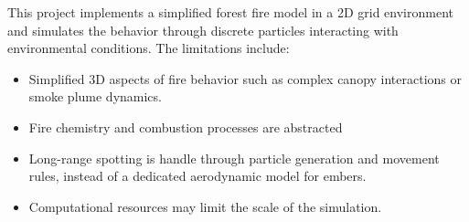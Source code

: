 This project implements a simplified forest fire model in a 2D grid environment and simulates the behavior through discrete particles interacting with environmental conditions.\newline 
The limitations include:
\begin{itemize}
	\item Simplified 3D aspects of fire behavior such as complex canopy interactions or smoke plume dynamics.
	\item Fire chemistry and combustion processes are abstracted
	\item Long-range spotting is handle through particle generation and movement rules, instead of a dedicated aerodynamic model for embers.
	\item Computational resources may limit the scale of the simulation.
\end{itemize}
